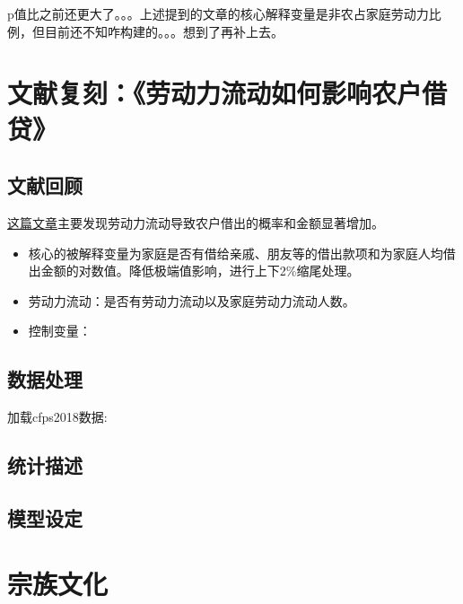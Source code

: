 \documentclass[
  oneside]{book}
\begin{document}
p值比之前还更大了。。。上述提到的文章的核心解释变量是非农占家庭劳动力比例，但目前还不知咋构建的。。。想到了再补上去。

\hypertarget{ux6587ux732eux590dux523bux52b3ux52a8ux529bux6d41ux52a8ux5982ux4f55ux5f71ux54cdux519cux6237ux501fux8d37}{%
\chapter{文献复刻：《劳动力流动如何影响农户借贷》}\label{ux6587ux732eux590dux523bux52b3ux52a8ux529bux6d41ux52a8ux5982ux4f55ux5f71ux54cdux519cux6237ux501fux8d37}}

\hypertarget{ux6587ux732eux56deux987e}{%
\section{文献回顾}\label{ux6587ux732eux56deux987e}}

\href{https://www.cnki.com.cn/Article/CJFDTOTAL-SJJJ202112006.htm}{这篇文章}主要发现劳动力流动导致农户借出的概率和金额显著增加。

\begin{itemize}
\item
  核心的被解释变量为家庭是否有借给亲戚、朋友等的借出款项和为家庭人均借出金额的对数值。降低极端值影响，进行上下2\%缩尾处理。
\item
  劳动力流动：是否有劳动力流动以及家庭劳动力流动人数。
\item
  控制变量：
\end{itemize}

\hypertarget{ux6570ux636eux5904ux7406}{%
\section{数据处理}\label{ux6570ux636eux5904ux7406}}

加载cfps2018数据:

\hypertarget{ux7edfux8ba1ux63cfux8ff0}{%
\section{统计描述}\label{ux7edfux8ba1ux63cfux8ff0}}

\hypertarget{ux6a21ux578bux8bbeux5b9a}{%
\section{模型设定}\label{ux6a21ux578bux8bbeux5b9a}}

\hypertarget{culture}{%
\chapter{宗族文化}\label{culture}}
\end{document}
